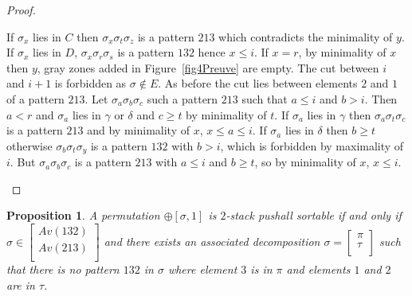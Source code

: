 \documentclass[11pt]{article}
\newtheorem{prop}[thm]{Proposition}
\newcommand{\pushall}{$2$-stack pushall sortable\xspace}
\begin{document}
\begin{proof}
\begin{itemize}
\begin{itemize}
\begin{itemize}
If $\sigma_x$ lies in $C$ then $\sigma_x \sigma_t \sigma_z$ is a pattern $213$ which contradicts the minimality of $y$. 
If $\sigma_x$ lies in $D$, $\sigma_x \sigma_r \sigma_s$ is a pattern $132$ hence $x \leq i$. 
If $x = r$, by minimality of $x$ then $y$, gray zones added in Figure~\ref{fig4Preuve} are empty. 
The cut between $i$ and $i + 1$ is forbidden as $\sigma \notin E$. 
As before the cut lies between elements $2$ and $1$ of a pattern $213$. 
Let $\sigma_a \sigma_b \sigma_c$ such a pattern $213$ such that $a \leq i$ and $b > i$. 
Then $a < r$ and $\sigma_a$ lies in $\gamma$ or $\delta$ and $c \geq t$ by minimality of $t$. 
If $\sigma_a$ lies in $\gamma$ then $\sigma_a \sigma_t \sigma_c$ is a pattern $213$ and by minimality of $x$, $x \leq a \leq i$. 
If $\sigma_a$ lies in $\delta$ then $b \geq t$ otherwise $\sigma_b \sigma_t \sigma_y$ is a pattern $132$ with $b > i$, which is forbidden by maximality of $i$. 
But $\sigma_a \sigma_b \sigma_c$ is a pattern $213$ with $a \leq i$ and $b \geq t$, so by minimality of $x$, $x \leq i$.
\end{itemize}
\end{itemize}
\end{itemize}

\end{proof}


\begin{prop}
\label{prop:+[x,1]pt}
A permutation $\oplus[\sigma,1]$ is \pushall if and only if $\sigma \in \left[
\begin{array}{l}
Av(132) \\
Av(213) \\
\end{array}
\right]$ and there exists an associated decomposition $\sigma = \left[
\begin{array}{l}
\pi \\
\tau \\
\end{array}
\right] $ such that there is no pattern $132$ in $\sigma$ where element $3$ is in $\pi$ and elements $1$ and $2$ are in $\tau$.
\end{prop}
\end{document}
